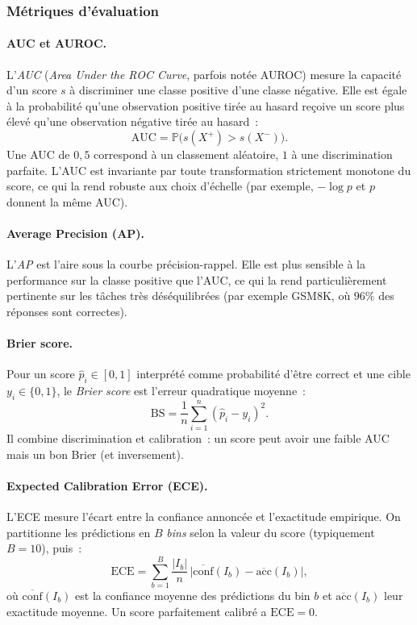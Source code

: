 \documentclass[12pt,a4paper]{article}
\begin{document}
\subsubsection*{Métriques d'évaluation}

\paragraph{AUC et AUROC.}
L'\emph{AUC} (\textit{Area Under the ROC Curve}, parfois notée AUROC) mesure la capacité d'un score $s$ à discriminer une classe positive d'une classe négative. Elle est égale à la probabilité qu'une observation positive tirée au hasard reçoive un score plus élevé qu'une observation négative tirée au hasard~:
\[
\mathrm{AUC} = \mathbb{P}\big(s(X^+) > s(X^-)\big).
\]
Une AUC de $0{,}5$ correspond à un classement aléatoire, $1$ à une discrimination parfaite. L'AUC est invariante par toute transformation strictement monotone du score, ce qui la rend robuste aux choix d'échelle (par exemple, $-\log p$ et $p$ donnent la même AUC).

\paragraph{Average Precision (AP).}
L'\emph{AP} est l'aire sous la courbe précision-rappel. Elle est plus sensible à la performance sur la classe positive que l'AUC, ce qui la rend particulièrement pertinente sur les tâches très déséquilibrées (par exemple GSM8K, où $96\%$ des réponses sont correctes).

\paragraph{Brier score.}
Pour un score $\hat{p}_i \in [0,1]$ interprété comme probabilité d'être correct et une cible $y_i \in \{0,1\}$, le \emph{Brier score} est l'erreur quadratique moyenne~:
\[
\mathrm{BS} = \frac{1}{n}\sum_{i=1}^{n}(\hat{p}_i - y_i)^2.
\]
Il combine discrimination et calibration~: un score peut avoir une faible AUC mais un bon Brier (et inversement).

\paragraph{Expected Calibration Error (ECE).}
L'ECE mesure l'écart entre la confiance annoncée et l'exactitude empirique. On partitionne les prédictions en $B$ \emph{bins} selon la valeur du score (typiquement $B = 10$), puis~:
\[
\mathrm{ECE} = \sum_{b=1}^{B} \frac{|I_b|}{n}\, \big| \overline{\mathrm{conf}}(I_b) - \overline{\mathrm{acc}}(I_b) \big|,
\]
où $\overline{\mathrm{conf}}(I_b)$ est la confiance moyenne des prédictions du bin $b$ et $\overline{\mathrm{acc}}(I_b)$ leur exactitude moyenne. Un score parfaitement calibré a $\mathrm{ECE} = 0$.
\end{document}
